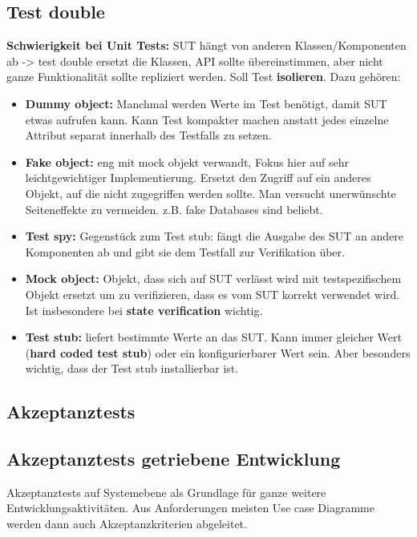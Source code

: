\documentclass{book}
\begin{document}
    \subsection{Test double}
    \textbf{Schwierigkeit bei Unit Tests:} SUT hängt von anderen Klassen/Komponenten ab -> test double ersetzt die Klassen, API sollte übereinstimmen, aber nicht ganze Funktionalität sollte repliziert werden. Soll Test \textbf{isolieren}.
    Dazu gehören:
    \begin{itemize}
        \item \textbf{Dummy object:} Manchmal werden Werte im Test benötigt, damit SUT etwas aufrufen kann. Kann Test kompakter machen anstatt jedes einzelne Attribut separat innerhalb des Testfalls zu setzen.
        \item \textbf{Fake object:} eng mit mock objekt verwandt, Fokus hier auf sehr leichtgewichtiger Implementierung. Ersetzt den Zugriff auf ein anderes Objekt, auf die nicht zugegriffen werden sollte. Man versucht unerwünschte Seiteneffekte zu vermeiden. z.B. fake Databases sind beliebt.
        \item \textbf{Test spy:} Gegenstück zum Test stub: fängt die Ausgabe des SUT an andere Komponenten ab und gibt sie dem Testfall zur Verifikation über.
        \item \textbf{Mock object:} Objekt, dass sich auf SUT verlässt wird mit testspezifischem Objekt ersetzt um zu verifizieren, dass es vom SUT korrekt verwendet wird. Ist insbesondere bei \textbf{state verification} wichtig.
        \item \textbf{Test stub:} liefert bestimmte Werte an das SUT. Kann immer gleicher Wert (\textbf{hard coded test stub}) oder ein konfigurierbarer Wert sein. Aber besonders wichtig, dass der Test stub installierbar ist.
    \end{itemize}
    \subsection{Akzeptanztests}
    \subsection{Akzeptanztests getriebene Entwicklung}
    Akzeptanztests auf Systemebene als Grundlage für ganze weitere Entwicklungsaktivitäten. Aus Anforderungen meisten Use case Diagramme werden dann auch Akzeptanzkriterien abgeleitet.
\end{document}
